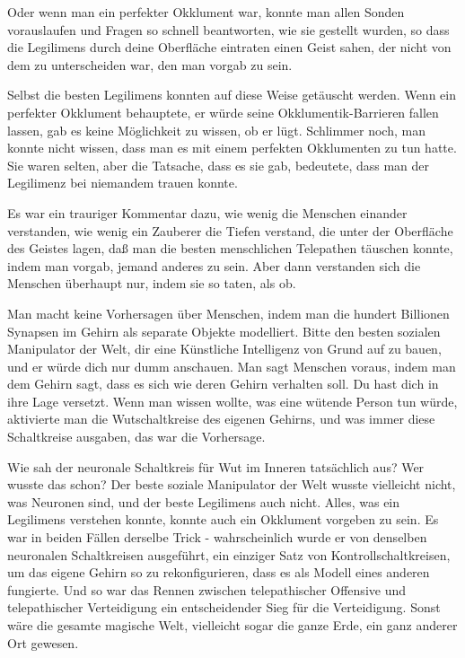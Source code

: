 Oder wenn man ein perfekter Okklument war, konnte man allen Sonden vorauslaufen
und Fragen so schnell beantworten, wie sie gestellt wurden, so dass die
Legilimens durch deine Oberfläche eintraten einen Geist sahen, der nicht von dem
zu unterscheiden war, den man vorgab zu sein.

Selbst die besten Legilimens konnten auf diese Weise getäuscht werden. Wenn ein
perfekter Okklument behauptete, er würde seine Okklumentik-Barrieren fallen
lassen, gab es keine Möglichkeit zu wissen, ob er lügt. Schlimmer noch, man
konnte nicht wissen, dass man es mit einem perfekten Okklumenten zu tun hatte.
Sie waren selten, aber die Tatsache, dass es sie gab, bedeutete, dass man der
Legilimenz bei niemandem trauen konnte.

Es war ein trauriger Kommentar dazu, wie wenig die Menschen einander verstanden,
wie wenig ein Zauberer die Tiefen verstand, die unter der Oberfläche des Geistes
lagen, daß man die besten menschlichen Telepathen täuschen konnte, indem man
vorgab, jemand anderes zu sein. Aber dann verstanden sich die Menschen überhaupt
nur, indem sie so taten, als ob.

Man macht keine Vorhersagen über Menschen, indem man die hundert Billionen
Synapsen im Gehirn als separate Objekte modelliert. Bitte den besten sozialen
Manipulator der Welt, dir eine Künstliche Intelligenz von Grund auf zu bauen,
und er würde dich nur dumm anschauen. Man sagt Menschen voraus, indem man dem
Gehirn sagt, dass es sich wie deren Gehirn verhalten soll. Du hast dich in ihre
Lage versetzt. Wenn man wissen wollte, was eine wütende Person tun würde,
aktivierte man die Wutschaltkreise des eigenen Gehirns, und was immer diese
Schaltkreise ausgaben, das war die Vorhersage.

Wie sah der neuronale Schaltkreis für Wut im Inneren tatsächlich aus? Wer wusste
das schon? Der beste soziale Manipulator der Welt wusste vielleicht nicht, was
Neuronen sind, und der beste Legilimens auch nicht. Alles, was ein Legilimens
verstehen konnte, konnte auch ein Okklument vorgeben zu sein. Es war in beiden
Fällen derselbe Trick - wahrscheinlich wurde er von denselben neuronalen
Schaltkreisen ausgeführt, ein einziger Satz von Kontrollschaltkreisen, um das
eigene Gehirn so zu rekonfigurieren, dass es als Modell eines anderen fungierte.
Und so war das Rennen zwischen telepathischer Offensive und telepathischer
Verteidigung ein entscheidender Sieg für die Verteidigung. Sonst wäre die
gesamte magische Welt, vielleicht sogar die ganze Erde, ein ganz anderer Ort
gewesen.

